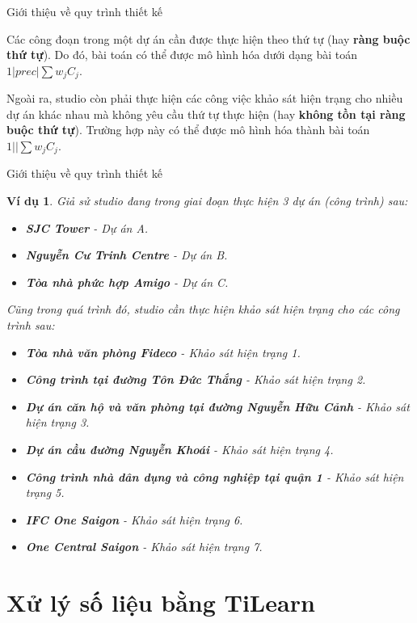 \documentclass[10pt]{beamer}
\newtheorem{vd}{Ví dụ}[section]
\begin{document}
\begin{frame}{Giới thiệu về quy trình thiết kế}
    
Các công đoạn trong một dự án cần được thực hiện theo thứ tự (hay \textbf{ràng buộc thứ tự}). Do đó, bài toán có thể được mô hình hóa dưới dạng bài toán $1|prec|\sum w_j C_j$.

Ngoài ra, studio còn phải thực hiện các công việc khảo sát hiện trạng cho nhiều dự án khác nhau mà không yêu cầu thứ tự thực hiện (hay \textbf{không tồn tại ràng buộc thứ tự}). Trường hợp này có thể được mô hình hóa thành bài toán $1||\sum w_j C_j$.
\end{frame}

\begin{frame}{Giới thiệu về quy trình thiết kế}
\begin{vd}

Giả sử studio đang trong giai đoạn thực hiện 3 dự án (công trình) sau:

\begin{itemize} \footnotesize
\item \textbf{SJC Tower} - Dự án A.
\item \textbf{Nguyễn Cư Trinh Centre} - Dự án B.
\item \textbf{Tòa nhà phức hợp Amigo} - Dự án C.
\end{itemize}

Cũng trong quá trình đó, studio cần thực hiện khảo sát hiện trạng cho các công trình sau:
\begin{itemize} \footnotesize
\item \textbf{Tòa nhà văn phòng Fideco} - Khảo sát hiện trạng 1.
\item \textbf{Công trình tại đường Tôn Đức Thắng} - Khảo sát hiện trạng 2.
\item \textbf{Dự án căn hộ và văn phòng tại đường Nguyễn Hữu Cảnh} - Khảo sát hiện trạng 3.
\item \textbf{Dự án cầu đường Nguyễn Khoái} - Khảo sát hiện trạng 4.
\item \textbf{Công trình nhà dân dụng và công nghiệp tại quận 1} - Khảo sát hiện trạng 5.
\item \textbf{IFC One Saigon} - Khảo sát hiện trạng 6.
\item \textbf{One Central Saigon} - Khảo sát hiện trạng 7.
\end{itemize}
\end{vd}
\end{frame}

\section*{Xử lý số liệu bằng TiLearn}
\end{document}
